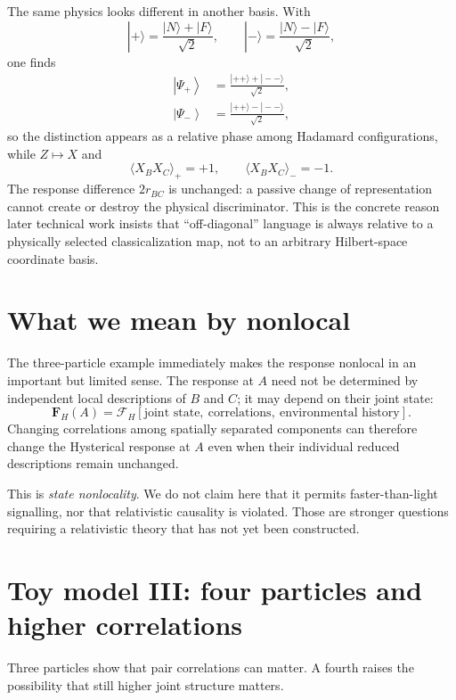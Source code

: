 \documentclass[11pt]{article}
\newcommand{\FH}{\mathbf F_{\!H}}
\newcommand{\ket}[1]{\left|#1\right\rangle}
\begin{document}
The same physics looks different in another basis. With
\begin{equation}
|+\rangle=\frac{|N\rangle+|F\rangle}{\sqrt2},\qquad
|-\rangle=\frac{|N\rangle-|F\rangle}{\sqrt2},
\end{equation}
one finds
\begin{align}
\ket{\Psi_+}&=\frac{|++\rangle+|--\rangle}{\sqrt2},\\
\ket{\Psi_-}&=\frac{|++\rangle-|--\rangle}{\sqrt2},
\end{align}
so the distinction appears as a relative phase among Hadamard configurations, while $Z\mapsto X$ and
\begin{equation}
\langle X_BX_C\rangle_{+}=+1,\qquad \langle X_BX_C\rangle_{-}=-1.
\end{equation}
The response difference $2r_{BC}$ is unchanged: a passive change of representation cannot create or destroy the physical discriminator.
This is the concrete reason later technical work insists that ``off-diagonal'' language is always relative to a physically selected classicalization map, not to an arbitrary Hilbert-space coordinate basis.

\section{What we mean by nonlocal}
The three-particle example immediately makes the response nonlocal in an important but limited sense. The response at $A$ need not be determined by independent local descriptions of $B$ and $C$; it may depend on their joint state:
\begin{equation}
\boxed{\FH(A)=\mathcal F_H[\text{joint state},\ \text{correlations},\ \text{environmental history}].}
\end{equation}
Changing correlations among spatially separated components can therefore change the Hysterical response at $A$ even when their individual reduced descriptions remain unchanged.

This is \emph{state nonlocality}. We do not claim here that it permits faster-than-light signalling, nor that relativistic causality is violated. Those are stronger questions requiring a relativistic theory that has not yet been constructed.

\section{Toy model III: four particles and higher correlations}
Three particles show that pair correlations can matter. A fourth raises the possibility that still higher joint structure matters.
\end{document}
